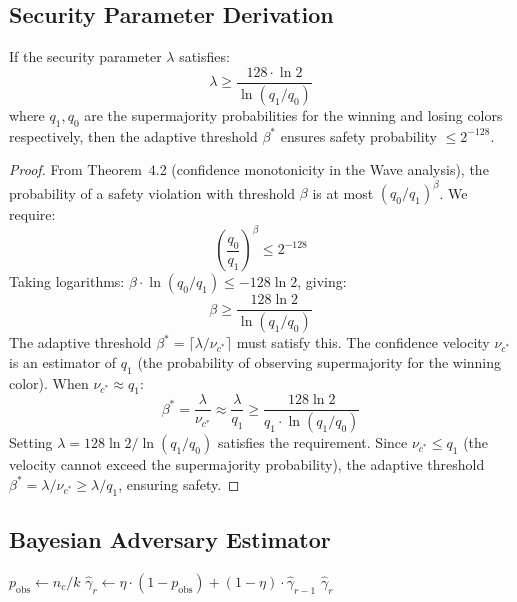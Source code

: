\subsection{Security Parameter Derivation}

\begin{theorem}
\label{thm:ray-adaptive-safety}
If the security parameter $\lambda$ satisfies:
\[
\lambda \geq \frac{128 \cdot \ln 2}{\ln(q_1 / q_0)}
\]
where $q_1, q_0$ are the supermajority probabilities for the winning and losing colors
respectively, then the adaptive threshold $\beta^*$ ensures safety probability
$\leq 2^{-128}$.
\end{theorem}

\begin{proof}
From Theorem~4.2 (confidence monotonicity in the Wave analysis), the probability of
a safety violation with threshold $\beta$ is at most $(q_0/q_1)^\beta$. We require:
\[
\left(\frac{q_0}{q_1}\right)^\beta \leq 2^{-128}
\]
Taking logarithms: $\beta \cdot \ln(q_0/q_1) \leq -128 \ln 2$, giving:
\[
\beta \geq \frac{128 \ln 2}{\ln(q_1/q_0)}
\]
The adaptive threshold $\beta^* = \lceil \lambda / \nu_{c^*} \rceil$ must satisfy this.
The confidence velocity $\nu_{c^*}$ is an estimator of $q_1$ (the probability of
observing supermajority for the winning color). When $\nu_{c^*} \approx q_1$:
\[
\beta^* = \frac{\lambda}{\nu_{c^*}} \approx \frac{\lambda}{q_1} \geq \frac{128 \ln 2}{q_1 \cdot \ln(q_1/q_0)}
\]
Setting $\lambda = 128 \ln 2 / \ln(q_1/q_0)$ satisfies the requirement. Since
$\nu_{c^*} \leq q_1$ (the velocity cannot exceed the supermajority probability), the
adaptive threshold $\beta^* = \lambda/\nu_{c^*} \geq \lambda/q_1$, ensuring safety.
\end{proof}

\subsection{Bayesian Adversary Estimator}

\begin{algorithm}[H]
\caption{Online Bayesian Adversary Estimator}
\label{alg:ray-bayes-estimator}
\begin{algorithmic}[1]
    \State {}
    \State $p_{\text{obs}} \gets n_c / k$ 
    \State {}
    \State $\hat{\gamma}_r \gets \eta \cdot (1 - p_{\text{obs}}) + (1 - \eta) \cdot \hat{\gamma}_{r-1}$
    \State \Return $\hat{\gamma}_r$
\EndFunction
\end{algorithmic}
\end{algorithm}

